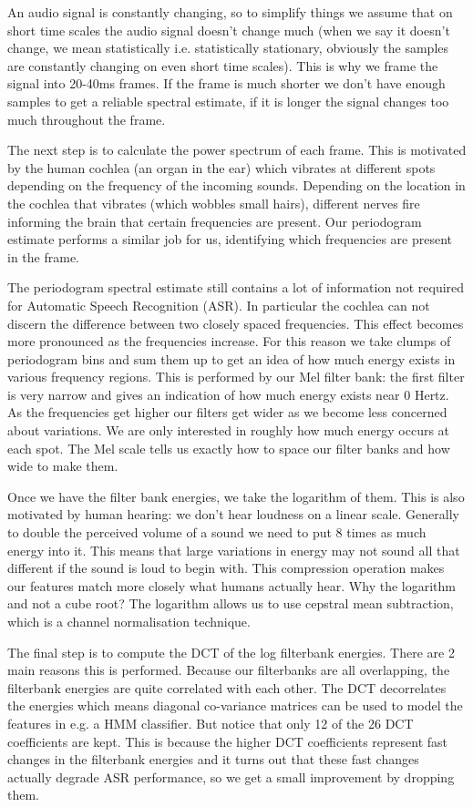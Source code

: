 An audio signal is constantly changing, so to simplify things we assume that on short time scales the audio signal doesn't change much (when we say it doesn't change, we mean statistically i.e. statistically stationary, obviously the samples are constantly changing on even short time scales). This is why we frame the signal into 20-40ms frames. If the frame is much shorter we don't have enough samples to get a reliable spectral estimate, if it is longer the signal changes too much throughout the frame.

The next step is to calculate the power spectrum of each frame. This is motivated by the human cochlea (an organ in the ear) which vibrates at different spots depending on the frequency of the incoming sounds. Depending on the location in the cochlea that vibrates (which wobbles small hairs), different nerves fire informing the brain that certain frequencies are present. Our periodogram estimate performs a similar job for us, identifying which frequencies are present in the frame.

The periodogram spectral estimate still contains a lot of information not required for Automatic Speech Recognition (ASR). In particular the cochlea can not discern the difference between two closely spaced frequencies. This effect becomes more pronounced as the frequencies increase. For this reason we take clumps of periodogram bins and sum them up to get an idea of how much energy exists in various frequency regions. This is performed by our Mel filter bank: the first filter is very narrow and gives an indication of how much energy exists near 0 Hertz. As the frequencies get higher our filters get wider as we become less concerned about variations. We are only interested in roughly how much energy occurs at each spot. The Mel scale tells us exactly how to space our filter banks and how wide to make them. 

Once we have the filter bank energies, we take the logarithm of them. This is also motivated by human hearing: we don't hear loudness on a linear scale. Generally to double the perceived volume of a sound we need to put 8 times as much energy into it. This means that large variations in energy may not sound all that different if the sound is loud to begin with. This compression operation makes our features match more closely what humans actually hear. Why the logarithm and not a cube root? The logarithm allows us to use cepstral mean subtraction, which is a channel normalisation technique.

The final step is to compute the DCT of the log filterbank energies. There are 2 main reasons this is performed. Because our filterbanks are all overlapping, the filterbank energies are quite correlated with each other. The DCT decorrelates the energies which means diagonal co-variance matrices can be used to model the features in e.g. a HMM classifier. But notice that only 12 of the 26 DCT coefficients are kept. This is because the higher DCT coefficients represent fast changes in the filterbank energies and it turns out that these fast changes actually degrade ASR performance, so we get a small improvement by dropping them.

